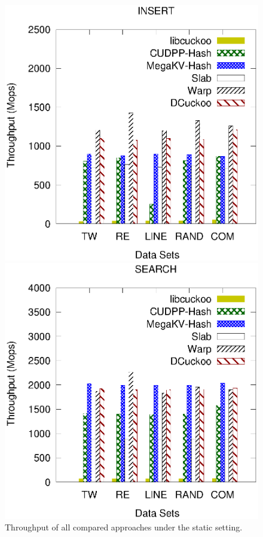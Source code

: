 \begin{figure}[t]
	\begin{minipage}{0.48\linewidth}\centering
		\includegraphics[width=\linewidth]{pic/static/static_insert.eps}
		\centerline{}
	\end{minipage}
	\hfill
	\begin{minipage}{0.48\linewidth}\centering
		\includegraphics[width=\linewidth]{pic/static/static_search.eps}
		\centerline{}
	\end{minipage}
	\caption{Throughput of all compared approaches under the static setting.}
	\label{fig:static-all}
\end{figure}

